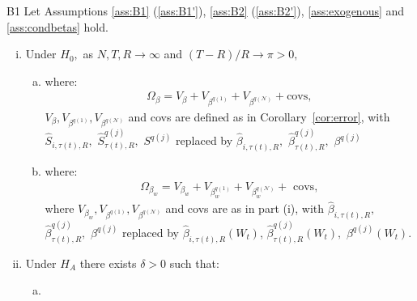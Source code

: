 \begin{namedtheorem}{B1}\label{th:B1}
Let Assumptions \ref{ass:B1} (\ref{ass:B1'}), \ref{ass:B2} (\ref{ass:B2'}), \ref{ass:exogenous} and \ref{ass:condbetas} hold.
\begin{enumerate}[(i)]
    \item Under $H_{0},$ as $N,T,R\rightarrow \infty $ and $(T-R)/R\rightarrow \pi >0,$
    \begin{enumerate}[(a)]
        \item \hspace*{-\leftmargin}%
        where: 
        \begin{align*}
            \Omega_{\beta }=V_{\beta}+V_{\beta ^{q(1)}}+V_{\beta^{q(\mathcal{N})}}+\text{covs},
        \end{align*}
        $V_{\beta},V_{\beta ^{q(1)}},V_{\beta ^{q(\mathcal{N})}}$ and covs are defined as in Corollary~\ref{cor:error}, with $\widehat{S}_{i,\tau(t),R},$ $\widehat{S}_{\tau(t),R}^{q(j)},$ $S^{q(j)}$ replaced by $\widehat{\beta }_{i,\tau(t),R},$ $\widehat{\beta }_{\tau(t),R}^{q(j)},$ $\beta ^{q(j)}$
    \item \hspace*{-\leftmargin}%
    where: 
    \begin{align*}
        \Omega_{\beta_w}=V_{\beta_w}+V_{\beta_w^{q(1)}}+V_{\beta_w^{q(\mathcal{N})}}+\text{ covs},
    \end{align*}%
    where $V_{\beta_w},V_{\beta ^{q(1)}},V_{\beta ^{q(\mathcal{N})}}$ and covs are as in part (i), with $\widehat{\beta }_{i,\tau(t),R},$ $\widehat{\beta }_{\tau(t),R}^{q(j)},$ $\beta ^{q(j)}$ replaced by $\widehat{\beta }_{i,\tau(t),R}\left( W_t\right)$, $\widehat{\beta }_{\tau(t),R}^{q(j)}\left( W_t\right) ,$ $\beta ^{q(j)}\left(W_t\right)$.
    \end{enumerate}
    \item Under $H_{A}$ there exists $\delta >0$ such that: 
    \begin{enumerate}[(a)]
        \item \hspace*{-\leftmargin}%

\end{enumerate}
\end{enumerate}
\end{namedtheorem}
